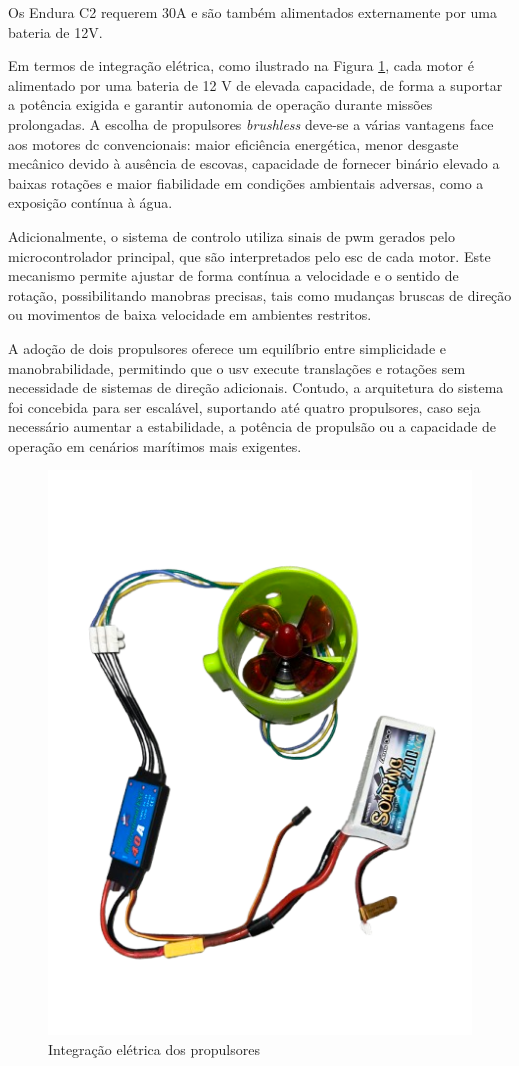 Os Endura C2 requerem 30A e são também alimentados externamente por uma bateria de 12V.

Em termos de integração elétrica, como ilustrado na Figura \ref{fig:bat-thruster}, cada motor é alimentado por uma bateria de 12 V de elevada capacidade, de forma a suportar a potência exigida e garantir autonomia de operação durante missões prolongadas. A escolha de propulsores \emph{brushless} deve-se a várias vantagens face aos motores \gls{dc} convencionais: maior eficiência energética, menor desgaste mecânico devido à ausência de escovas, capacidade de fornecer binário elevado a baixas rotações e maior fiabilidade em condições ambientais adversas, como a exposição contínua à água.

Adicionalmente, o sistema de controlo utiliza sinais de \gls{pwm} gerados pelo microcontrolador principal, que são interpretados pelo \gls{esc} de cada motor. Este mecanismo permite ajustar de forma contínua a velocidade e o sentido de rotação, possibilitando manobras precisas, tais como mudanças bruscas de direção ou movimentos de baixa velocidade em ambientes restritos.

A adoção de dois propulsores oferece um equilíbrio entre simplicidade e manobrabilidade, permitindo que o \gls{usv} execute translações e rotações sem necessidade de sistemas de direção adicionais. Contudo, a arquitetura do sistema foi concebida para ser escalável, suportando até quatro propulsores, caso seja necessário aumentar a estabilidade, a potência de propulsão ou a capacidade de operação em cenários marítimos mais exigentes.

\begin{figure}[H]
    \centering
    \includegraphics[width=0.5\linewidth, angle=-90]{figuras/IMG_4420-removebg-preview.png}
    \caption{Integração elétrica dos propulsores}
    \label{fig:bat-thruster}
\end{figure}

